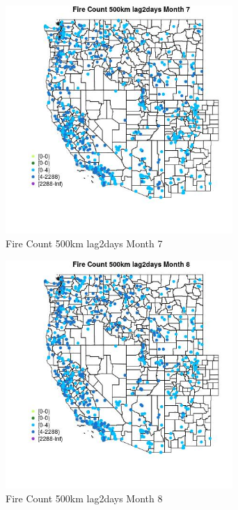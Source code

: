 \begin{figure} 
\centering  
\includegraphics[width=0.77\textwidth]{Code_Outputs/Report_ML_input_PM25_Step4_part_e_de_duplicated_aves_compiled_2019-05-21wNAs_MapObsMo7Fire_Count_500km_lag2days.jpg} 
\caption{\label{fig:Report_ML_input_PM25_Step4_part_e_de_duplicated_aves_compiled_2019-05-21wNAsMapObsMo7Fire_Count_500km_lag2days}Fire Count 500km lag2days Month 7} 
\end{figure} 
 

\begin{figure} 
\centering  
\includegraphics[width=0.77\textwidth]{Code_Outputs/Report_ML_input_PM25_Step4_part_e_de_duplicated_aves_compiled_2019-05-21wNAs_MapObsMo8Fire_Count_500km_lag2days.jpg} 
\caption{\label{fig:Report_ML_input_PM25_Step4_part_e_de_duplicated_aves_compiled_2019-05-21wNAsMapObsMo8Fire_Count_500km_lag2days}Fire Count 500km lag2days Month 8} 
\end{figure} 
 

